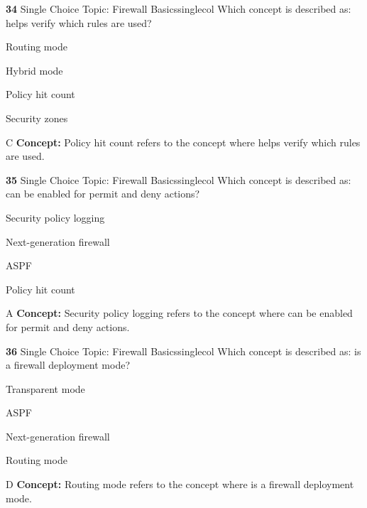 \documentclass[10pt,a4paper]{article}
\begin{document}
\begin{qcard}{\color{white}\textbf{34} \hfill \small Single Choice \textbar{} Topic: Firewall Basics}{singlecol}
Which concept is described as: helps verify which rules are used?

\begin{qoptions}
\item Routing mode
\item Hybrid mode
\item Policy hit count
\item Security zones
\end{qoptions}
\begin{explainbox}{C}
\textbf{Concept:} Policy hit count refers to the concept where helps verify which rules are used.
\end{explainbox}
\end{qcard}

\begin{qcard}{\color{white}\textbf{35} \hfill \small Single Choice \textbar{} Topic: Firewall Basics}{singlecol}
Which concept is described as: can be enabled for permit and deny actions?

\begin{qoptions}
\item Security policy logging
\item Next-generation firewall
\item ASPF
\item Policy hit count
\end{qoptions}
\begin{explainbox}{A}
\textbf{Concept:} Security policy logging refers to the concept where can be enabled for permit and deny actions.
\end{explainbox}
\end{qcard}

\begin{qcard}{\color{white}\textbf{36} \hfill \small Single Choice \textbar{} Topic: Firewall Basics}{singlecol}
Which concept is described as: is a firewall deployment mode?

\begin{qoptions}
\item Transparent mode
\item ASPF
\item Next-generation firewall
\item Routing mode
\end{qoptions}
\begin{explainbox}{D}
\textbf{Concept:} Routing mode refers to the concept where is a firewall deployment mode.
\end{explainbox}
\end{qcard}
\end{document}
